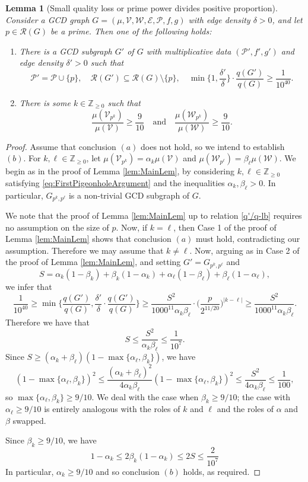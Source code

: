 \documentclass[12pt]{amsart}
\numberwithin{equation}{section}
\newtheorem{lem}{Lemma}[section]
\theoremstyle{definition}
\theoremstyle{remark}
\newcommand{\Z}{\mathbb{Z}}
\newcommand{\CE}{\mathcal{E}}
\newcommand{\CP}{\mathcal{P}}
\newcommand{\CR}{\mathcal{R}}
\newcommand{\CV}{\mathcal{V}}
\newcommand{\CW}{\mathcal{W}}
\renewcommand{\le}{\leqslant}
\renewcommand{\ge}{\geqslant}
\begin{document}
\begin{lem}[Small quality loss or prime power divides positive proportion]\label{lem:SmallPrime}
Consider a GCD graph $G=(\mu,\CV,\CW,\CE,\CP,f,g)$ with edge density $\delta>0$, and let $p\in\CR(G)$ be a prime. Then one of the following holds:
\begin{enumerate}
\item There is a GCD subgraph $G'$ of $G$ with multiplicative data $(\CP',f',g')$ and edge density $\delta'>0$ such that
\[
\CP'=\CP\cup\{p\},\quad
\CR(G')\subseteq\CR(G)\setminus\{p\},\quad 
\min\bigg\{1,\frac{\delta'}{\delta}\bigg\}
	\cdot \frac{q(G')}{q(G)} \ge \frac{1}{10^{40}} .
\]
\item There is some $k\in\Z_{\ge0}$ such that
\[
\frac{\mu(\CV_{p^k})}{\mu(\CV)}\ge \frac{9}{10}
\quad\text{and}\quad
\frac{\mu(\CW_{p^k})}{\mu(\CW)}\ge \frac{9}{10}.
\]
\end{enumerate}
\end{lem}

\begin{proof}
Assume that conclusion $(a)$ does not hold, so we intend to establish $(b)$. For $k,\ell\in\Z_{\ge0}$, let $\mu(\CV_{p^k})=\alpha_k\mu(\CV)$ and $\mu(\CW_{p^\ell})=\beta_\ell\mu(\CW)$. We begin as in the proof of  Lemma \ref{lem:MainLem}, by considering $k,\ell\in\Z_{\ge0}$ satisfying \eqref{eq:FirstPigeonholeArgument} and the inequalities $\alpha_k,\beta_\ell>0$. In particular, $G_{p^k,p^\ell}$ is a non-trivial GCD subgraph of $G$.

We note that the proof of Lemma \ref{lem:MainLem} up to relation \eqref{q'/q-lb} requires no assumption on the size of $p$. Now, if $k=\ell$, then Case 1 of the proof of Lemma \ref{lem:MainLem} shows that conclusion $(a)$ must hold, contradicting our assumption. Therefore we may assume that $k\ne \ell$. Now, arguing as in Case 2 of the proof of Lemma \ref{lem:MainLem}, and setting $G'=G_{p^k,p^\ell}$ and
\[
S=\alpha_k(1-\beta_k)
+\beta_k(1-\alpha_k)
+\alpha_\ell(1-\beta_\ell)
+\beta_\ell(1-\alpha_\ell),
\]
we infer that
\[
	\frac{1}{10^{40}}\ge\min\bigg\{ \frac{q(G')}{q(G)},\frac{\delta'}{\delta}\cdot \frac{q(G')}{q(G)} \bigg\}
	\ge\frac{S^{2}}{1000^{11}\alpha_k\beta_\ell}
		\cdot \Big(\frac{p}{2^{11/20}}\Big)^{|k-\ell|}\ge\frac{S^{2}}{1000^{11}\alpha_k\beta_\ell}.
\]
Therefore we have that
\[
S\le \frac{S^2}{\alpha_k\beta_\ell}\le \frac{1}{10^{7}}.
\]
Since $S\ge (\alpha_k+\beta_\ell)(1-\max\{\alpha_\ell,\beta_k\})$, we have
\[
(1-\max\{\alpha_\ell,\beta_k\})^2\le \frac{ (\alpha_k+\beta_\ell)^2}{4\alpha_k\beta_\ell}(1-\max\{\alpha_\ell,\beta_k\})^2\le \frac{S^2}{4\alpha_k\beta_\ell}\le \frac{1}{100},
\]
so $\max\{\alpha_\ell,\beta_k\}\ge 9/10$. We deal with the case when $\beta_k\ge 9/10$; the case with $\alpha_\ell\ge 9/10$ is entirely analogous with the roles of $k$ and $\ell$ and the roles of $\alpha$ and $\beta$ swapped. 

Since $\beta_k\ge 9/10$, we have
\[
1-\alpha_k\le 2\beta_k(1-\alpha_k)\le 2S\le \frac{2}{10^{7}}
\]
In particular, $\alpha_k \ge 9/10$ and so conclusion $(b)$ holds, as required.
\end{proof}
\end{document}
